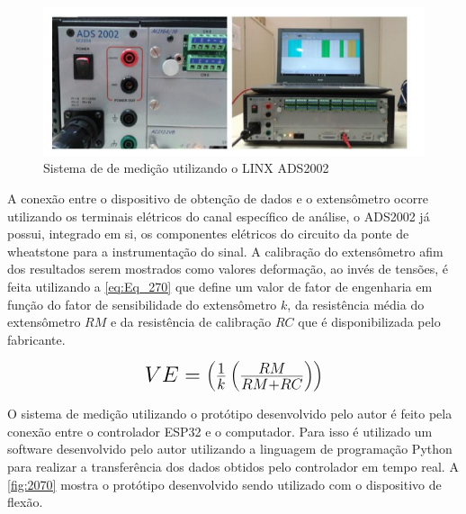 \begin{figure}[htb]
	\caption{\label{fig:2060} Sistema de de medição utilizando o LINX ADS2002}
	\begin{center}
		\includegraphics[width=\textwidth]{pictures/2060.png}
	\end{center}
\end{figure}

A conexão entre o dispositivo de obtenção de dados e o extensômetro ocorre utilizando os terminais elétricos do canal específico de análise, o ADS2002 já possui,
integrado em si, os componentes elétricos do circuito da ponte de wheatstone para a instrumentação do sinal.
A calibração do extensômetro afim dos resultados serem mostrados como valores deformação, ao invés de tensões, é feita utilizando a \autoref{eq:Eq_270} que define um valor de
fator de engenharia em função do fator de sensibilidade do extensômetro $k$, da resistência média do extensômetro $RM$ e da resistência de calibração $RC$ que é disponibilizada pelo fabricante.

\begin{equation}\label{eq:Eq_270}%
\mbox{\fontsize{17.28}{21.6}\selectfont\( %
VE = \left ( \frac{1}{k}\left ( \frac{RM}{RM + RC} \right ) \right )
\)} %
\end{equation}

\newline

O sistema de medição utilizando o protótipo desenvolvido pelo autor é feito pela conexão entre o controlador ESP32 e o computador.
Para isso é utilizado um software desenvolvido pelo autor utilizando a linguagem de programação Python para realizar a transferência
dos dados obtidos pelo controlador em tempo real.
A \autoref{fig:2070} mostra o protótipo desenvolvido sendo utilizado com o dispositivo de flexão.

